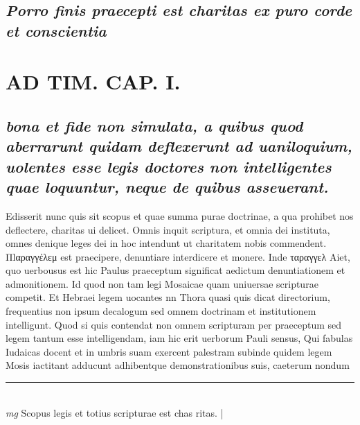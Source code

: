 \documentclass{article}
\begin{document}
\begin{pages}
\subsection*{\textit{Porro finis praecepti est charitas ex puro corde et conscientia }}
\section*{AD TIM. CAP. I. }
\marginpar{[ p.97 ]}
{}
\subsection*{\textit{bona et fide non simulata, a quibus quod aberrarunt quidam deflexerunt ad uaniloquium, uolentes esse legis doctores non intelligentes quae loquuntur, neque de quibus asseuerant. }}\pstart Edisserit nunc quis sit scopus et quae summa purae doctrinae, a qua prohibet nos deflectere, charitas ui delicet. Omnis inquit scriptura, et omnia dei instituta, omnes denique leges dei in hoc intendunt ut charitatem nobis commendent. Πlαραγγἐλεμ est praecipere, denuntiare interdicere et monere. Inde ταραγγελ Aiet, quo uerbousus est hic Paulus praeceptum significat aedictum denuntiationem et admonitionem. Id quod non tam legi Mosaicae quam uniuersae scripturae competit. Et Hebraei legem uocantes nn Thora quasi quis dicat directorium, frequentius non ipsum decalogum sed omnem doctrinam et institutionem intelligunt. Quod si quis contendat non omnem scripturam per praeceptum sed legem tantum esse intelligendam, iam hic erit uerborum Pauli sensus, Qui fabulas Iudaicas docent et in umbris suam exercent palestram subinde quidem legem Mosis iactitant adducunt adhibentque demonstrationibus suis, caeterum nondum  \pend
\vspace{0.5cm}\noindent
\vspace{0.2cm}\rule{1cm}{0.2pt}\\ 
\hspace{0.2cm}\textit{mg}
\footnotesize Scopus legis et totius scripturae est chas ritas. 
\normalsize| 

\end{pages}
\end{document}
